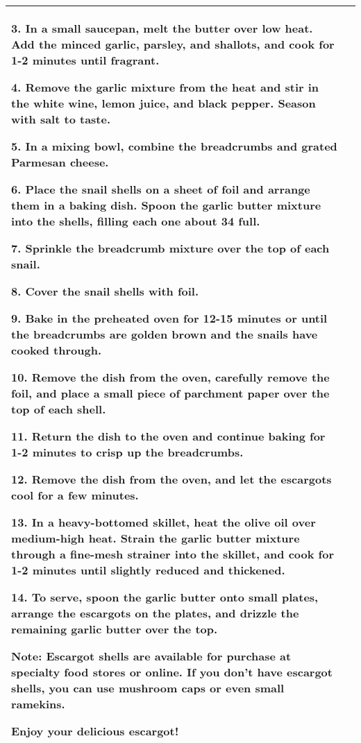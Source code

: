 \begin{table}[!h]
\begin{tabular}{lp{11.5cm}}
3. In a small saucepan, melt the butter over low heat. Add the minced garlic, parsley, and shallots, and cook for 1-2 minutes until fragrant.

4. Remove the garlic mixture from the heat and stir in the white wine, lemon juice, and black pepper. Season with salt to taste.

5. In a mixing bowl, combine the breadcrumbs and grated Parmesan cheese.

6. Place the snail shells on a sheet of foil and arrange them in a baking dish. Spoon the garlic butter mixture into the shells, filling each one about 3\/4 full.

7. Sprinkle the breadcrumb mixture over the top of each snail.

8. Cover the snail shells with foil.

9. Bake in the preheated oven for 12-15 minutes or until the breadcrumbs are golden brown and the snails have cooked through.

10. Remove the dish from the oven, carefully remove the foil, and place a small piece of parchment paper over the top of each shell.

11. Return the dish to the oven and continue baking for 1-2 minutes to crisp up the breadcrumbs.

12. Remove the dish from the oven, and let the escargots cool for a few minutes.

13. In a heavy-bottomed skillet, heat the olive oil over medium-high heat. Strain the garlic butter mixture through a fine-mesh strainer into the skillet, and cook for 1-2 minutes until slightly reduced and thickened.

14. To serve, spoon the garlic butter onto small plates, arrange the escargots on the plates, and drizzle the remaining garlic butter over the top.

Note: Escargot shells are available for purchase at specialty food stores or online. If you don't have escargot shells, you can use mushroom caps or even small ramekins.

Enjoy your delicious escargot! \\
\midrule
\end{tabular}
\end{table}

